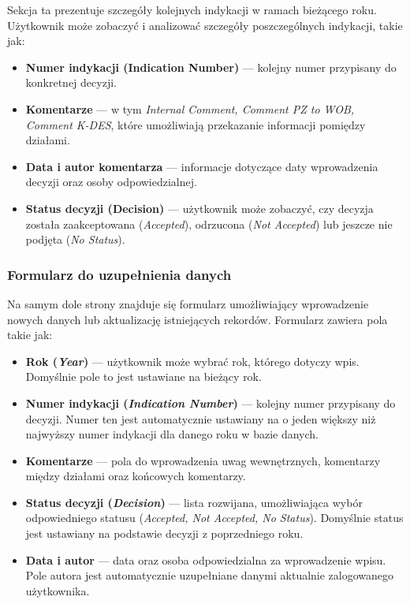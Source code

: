 Sekcja ta prezentuje szczegóły kolejnych indykacji w ramach bieżącego roku. Użytkownik może zobaczyć i analizować szczegóły poszczególnych indykacji, takie jak:

\begin{itemize}
\item \textbf{Numer indykacji (Indication Number)} — kolejny numer przypisany do konkretnej decyzji.
\item \textbf{Komentarze} — w tym \textit{Internal Comment, Comment PZ to WOB, Comment K-DES}, które umożliwiają przekazanie informacji pomiędzy działami.
\item \textbf{Data i autor komentarza} — informacje dotyczące daty wprowadzenia decyzji oraz osoby odpowiedzialnej.
\item \textbf{Status decyzji (Decision)} — użytkownik może zobaczyć, czy decyzja została zaakceptowana (\textit{Accepted}), odrzucona (\textit{Not Accepted}) lub jeszcze nie podjęta (\textit{No Status}).
\end{itemize}

\subsubsection{Formularz do uzupełnienia danych}

Na samym dole strony znajduje się formularz umożliwiający wprowadzenie nowych danych lub aktualizację istniejących rekordów. Formularz zawiera pola takie jak:

\begin{itemize}
\item \textbf{Rok (\textit{Year})} — użytkownik może wybrać rok, którego dotyczy wpis. Domyślnie pole to jest ustawiane na bieżący rok.
\item \textbf{Numer indykacji (\textit{Indication Number})} — kolejny numer przypisany do decyzji. Numer ten jest automatycznie ustawiany na o jeden większy niż najwyższy numer indykacji dla danego roku w bazie danych.
\item \textbf{Komentarze} — pola do wprowadzenia uwag wewnętrznych, komentarzy między działami oraz końcowych komentarzy.
\item \textbf{Status decyzji (\textit{Decision})} — lista rozwijana, umożliwiająca wybór odpowiedniego statusu (\textit{Accepted, Not Accepted, No Status}). Domyślnie status jest ustawiany na podstawie decyzji z poprzedniego roku.
\item \textbf{Data i autor} — data oraz osoba odpowiedzialna za wprowadzenie wpisu. Pole autora jest automatycznie uzupełniane danymi aktualnie zalogowanego użytkownika.
\end{itemize}

